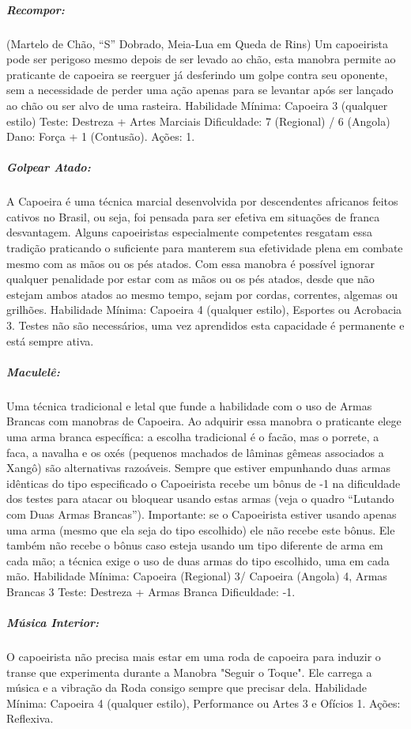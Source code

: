\subparagraph{\bf Recompor:}
(Martelo de Chão, “S” Dobrado, Meia-Lua em Queda de Rins) Um capoeirista pode ser perigoso mesmo depois de ser levado ao chão, esta manobra permite ao praticante de capoeira se reerguer já desferindo um golpe contra seu oponente, sem a necessidade de perder uma ação apenas para se levantar após ser lançado ao chão ou ser alvo de uma rasteira. 
	Habilidade Mínima: Capoeira 3 (qualquer estilo)
    Teste: Destreza + Artes Marciais
    Dificuldade: 7 (Regional) / 6 (Angola)
    Dano: Força + 1 (Contusão). 
    Ações: 1.

\subparagraph{\bf Golpear Atado:}
A Capoeira é uma técnica marcial desenvolvida por descendentes africanos feitos cativos no Brasil, ou seja, foi pensada para ser efetiva em situações de franca desvantagem. Alguns capoeiristas especialmente competentes resgatam essa tradição praticando o suficiente para manterem sua efetividade plena em combate mesmo com as mãos ou os pés atados. Com essa manobra é possível ignorar qualquer penalidade por estar com as mãos ou os pés atados, desde que não estejam ambos atados ao mesmo tempo, sejam por cordas, correntes, algemas ou grilhões. 
	Habilidade Mínima: Capoeira 4 (qualquer estilo), Esportes ou Acrobacia 3. 
    Testes não são necessários, uma vez aprendidos esta capacidade é permanente e está sempre ativa.

\subparagraph{\bf Maculelê:}
Uma técnica tradicional e letal que funde a habilidade com o uso de Armas Brancas com manobras de Capoeira. Ao adquirir essa manobra o praticante elege uma arma branca específica: a escolha tradicional é o facão, mas o porrete, a faca, a navalha e os oxés (pequenos machados de lâminas gêmeas associados a Xangô) são alternativas razoáveis. Sempre que estiver empunhando duas armas idênticas do tipo especificado o Capoeirista recebe um bônus de -1 na dificuldade dos testes para atacar ou bloquear usando estas armas (veja o quadro “Lutando com Duas Armas Brancas”). Importante: se o Capoeirista estiver usando apenas uma arma (mesmo que ela seja do tipo escolhido) ele não recebe este bônus. Ele também não recebe o bônus caso esteja usando um tipo diferente de arma em cada mão; a técnica exige o uso de duas armas do tipo escolhido, uma em cada mão. 
	Habilidade Mínima: Capoeira (Regional) 3/ Capoeira (Angola) 4, Armas Brancas 3
    Teste: Destreza + Armas Branca
    Dificuldade: -1.

\subparagraph{\bf Música Interior:}
O capoeirista não precisa mais estar em uma roda de capoeira para induzir o transe que experimenta durante a Manobra "Seguir o Toque". Ele carrega a música e a vibração da Roda consigo sempre que precisar dela. 
	Habilidade Mínima: Capoeira 4 (qualquer estilo), Performance ou Artes 3 e Ofícios 1. 
    Ações: Reflexiva.

